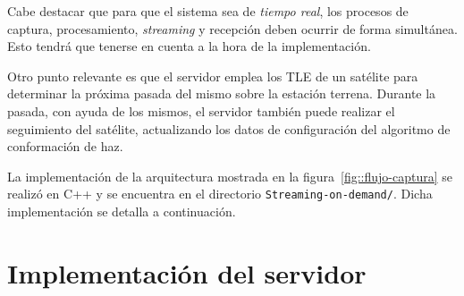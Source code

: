 \documentclass[../../main.tex]{subfiles}
\begin{document}
Cabe destacar que para que el sistema sea de \textit{tiempo real}, los procesos de captura, procesamiento, \textit{streaming} y recepción deben ocurrir de forma simultánea. Esto tendrá que tenerse en cuenta a la hora de la implementación.

Otro punto relevante es que el servidor emplea los TLE de un satélite para determinar la próxima pasada del mismo sobre la estación terrena. Durante la pasada, con ayuda de los mismos, el servidor también puede realizar el seguimiento del satélite, actualizando los datos de configuración del algoritmo de conformación de haz.


\begin{table}[H]
    \centering
    \caption{Requerimientos del cliente y el servidor en el diseño del sistema de envío de capturas en tiempo real.}\label{tab::reqs-cliente-servidor}
\end{table}


La implementación de la arquitectura mostrada en la figura~\ref{fig::flujo-captura} se realizó en C++ y se encuentra en el directorio \texttt{Streaming-on-demand/}. Dicha implementación se detalla a continuación.

\section{Implementación del servidor}\label{sec::implementacion-servidor}
\end{document}
